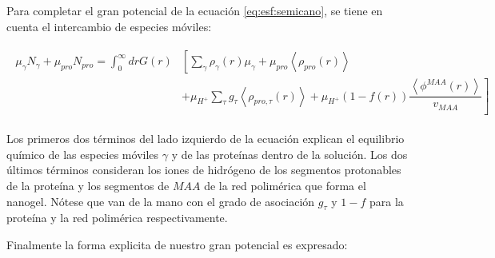 Para completar el gran potencial de la  ecuaci\'on  \ref{eq:esf:semicano}, se tiene en cuenta el intercambio de especies m\'oviles:
 

\begin{align}
	\begin{aligned}
		\mu_\gamma N_\gamma + \mu_{pro} N_{pro} =\int_0^\infty drG(r)&\left[\sum_{\gamma }{\rho_\gamma(r)\mu_\gamma}
		+ \mu_{pro} \left<\rho_{pro}(r)\right> \right. \\
		& \left. +\mu_{H^+}\sum_{\tau}{g_\tau\left<\rho_{pro,\tau}(r)\right> } +\mu_{H^+}(1-f(r))\dfrac{\left<\phi^{MAA}(r)\right>}{v_{MAA}}\right]
	\end{aligned}
\end{align}


Los primeros dos t\'erminos del lado izquierdo de la ecuaci\'on explican el equilibrio qu\'imico de las especies m\'oviles $\gamma$ y de las prote\'inas dentro de la soluci\'on.
Los dos \'ultimos t\'erminos consideran los iones de hidr\'ogeno de los segmentos protonables de la prote\'ina y los segmentos de  $MAA$ de la red polim\'erica que forma el nanogel. N\'otese que van de la mano con el grado de asociaci\'on $g_\tau$ y $1-f$ para la prote\'ina y la red polim\'erica respectivamente.


Finalmente la forma explicita de nuestro gran potencial es expresado:

